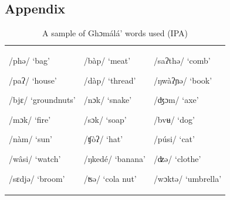 \documentclass[output=paper,newtxmath,modfonts,nonflat,draftmode]{langsci/langscibook}
\begin{document}
\clearpage
\subsection{Appendix}
\begin{table}
\caption{A sample of Ghɔmálá’ words used (IPA)}

\begin{tabularx}{\textwidth}{XXX}
/phə/ ‘bag’

/paʔ/ ‘house’

/bjɛ/ ‘groundnuts’

/mɔk/ ‘fire’

/nàm/ ‘sun’

/wâsi/ ‘watch’

/sɛdjə/ ‘broom’ & /bàp/ ‘meat’

/dàp/ ‘thread’

/nɔk/ ‘snake’

/sɔk/ ‘soap’

/ʧòʔ/ ‘hat’

/ŋkedé/ ‘banana’

/ʦə/ ‘cola nut’ & /saʔthə/   ‘comb’

/ŋwàʔɲə/ ‘book’

/ʤɔm/ ‘axe’

/bvʉ/ ‘dog’

/púsi/ ‘cat’

/ʣə/ ‘clothe’

/wɔktə/ ‘umbrella’\\
\end{tabularx}
\end{table}
\end{document}
